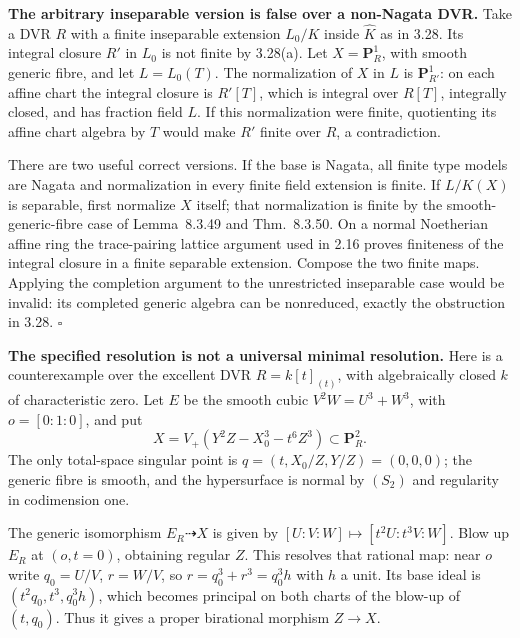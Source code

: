 \documentclass[11pt]{article}
\let\chapterexercise\exercise
\renewcommand{\exercise}[2]{\Needspace{8\baselineskip}\chapterexercise{#1}{#2}}
\begin{document}
\pf
\textbf{The arbitrary inseparable version is false over a non-Nagata DVR.} Take a DVR $R$ with a finite inseparable extension $L_0/K$ inside $\widehat K$ as in 3.28. Its integral closure $R'$ in $L_0$ is not finite by 3.28(a). Let $X=\mathbf P^1_R$, with smooth generic fibre, and let $L=L_0(T)$. The normalization of $X$ in $L$ is $\mathbf P^1_{R'}$: on each affine chart the integral closure is $R'[T]$, which is integral over $R[T]$, integrally closed, and has fraction field $L$. If this normalization were finite, quotienting its affine chart algebra by $T$ would make $R'$ finite over $R$, a contradiction.

There are two useful correct versions. If the base is Nagata, all finite type models are Nagata and normalization in every finite field extension is finite. If $L/K(X)$ is separable, first normalize $X$ itself; that normalization is finite by the smooth-generic-fibre case of Lemma~8.3.49 and Thm.~8.3.50. On a normal Noetherian affine ring the trace-pairing lattice argument used in 2.16 proves finiteness of the integral closure in a finite separable extension. Compose the two finite maps. Applying the completion argument to the unrestricted inseparable case would be invalid: its completed generic algebra can be nonreduced, exactly the obstruction in 3.28. \hfill$\square$

\pf
\textbf{The specified resolution is not a universal minimal resolution.} Here is a counterexample over the excellent DVR $R=k[t]_{(t)}$, with algebraically closed $k$ of characteristic zero. Let $E$ be the smooth cubic $V^2W=U^3+W^3$, with $o=[0:1:0]$, and put
\[ X=V_+(Y^2Z-X_0^3-t^6Z^3)\subset\mathbf P^2_R. \]
The only total-space singular point is $q=(t,X_0/Z,Y/Z)=(0,0,0)$; the generic fibre is smooth, and the hypersurface is normal by $(S_2)$ and regularity in codimension one.

The generic isomorphism $E_R\dashrightarrow X$ is given by $[U:V:W]\mapsto[t^2U:t^3V:W]$. Blow up $E_R$ at $(o,t=0)$, obtaining regular $Z$. This resolves that rational map: near $o$ write $q_0=U/V$, $r=W/V$, so $r=q_0^3+r^3=q_0^3h$ with $h$ a unit. Its base ideal is $(t^2q_0,t^3,q_0^3h)$, which becomes principal on both charts of the blow-up of $(t,q_0)$. Thus it gives a proper birational morphism $Z\to X$.
\end{document}
